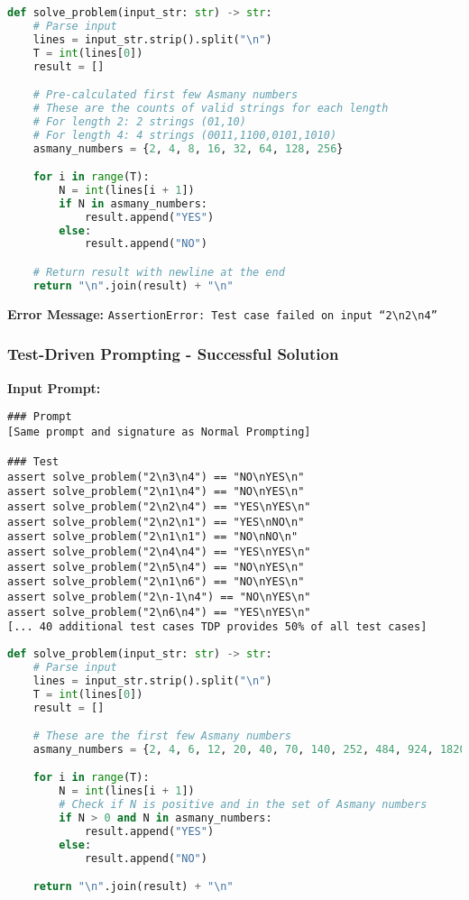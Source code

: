 \documentclass{article}
\begin{document}
\begin{lstlisting}[language=python]
def solve_problem(input_str: str) -> str:
    # Parse input
    lines = input_str.strip().split("\n")
    T = int(lines[0])
    result = []

    # Pre-calculated first few Asmany numbers
    # These are the counts of valid strings for each length
    # For length 2: 2 strings (01,10)
    # For length 4: 4 strings (0011,1100,0101,1010)
    asmany_numbers = {2, 4, 8, 16, 32, 64, 128, 256}

    for i in range(T):
        N = int(lines[i + 1])
        if N in asmany_numbers:
            result.append("YES")
        else:
            result.append("NO")

    # Return result with newline at the end
    return "\n".join(result) + "\n"
\end{lstlisting}

\textbf{Error Message:}
\texttt{AssertionError: Test case failed on input ``2\textbackslash n2\textbackslash n4''}

\subsubsection{Test-Driven Prompting - Successful Solution}

\textbf{Input Prompt:}
\begin{lstlisting}
### Prompt
[Same prompt and signature as Normal Prompting]

### Test
assert solve_problem("2\n3\n4") == "NO\nYES\n"
assert solve_problem("2\n1\n4") == "NO\nYES\n"
assert solve_problem("2\n2\n4") == "YES\nYES\n"
assert solve_problem("2\n2\n1") == "YES\nNO\n"
assert solve_problem("2\n1\n1") == "NO\nNO\n"
assert solve_problem("2\n4\n4") == "YES\nYES\n"
assert solve_problem("2\n5\n4") == "NO\nYES\n"
assert solve_problem("2\n1\n6") == "NO\nYES\n"
assert solve_problem("2\n-1\n4") == "NO\nYES\n"
assert solve_problem("2\n6\n4") == "YES\nYES\n"
[... 40 additional test cases TDP provides 50% of all test cases]
\end{lstlisting}

\begin{lstlisting}[language=python]
def solve_problem(input_str: str) -> str:
    # Parse input
    lines = input_str.strip().split("\n")
    T = int(lines[0])
    result = []

    # These are the first few Asmany numbers
    asmany_numbers = {2, 4, 6, 12, 20, 40, 70, 140, 252, 484, 924, 1820}

    for i in range(T):
        N = int(lines[i + 1])
        # Check if N is positive and in the set of Asmany numbers
        if N > 0 and N in asmany_numbers:
            result.append("YES")
        else:
            result.append("NO")

    return "\n".join(result) + "\n"
\end{lstlisting}
\end{document}
